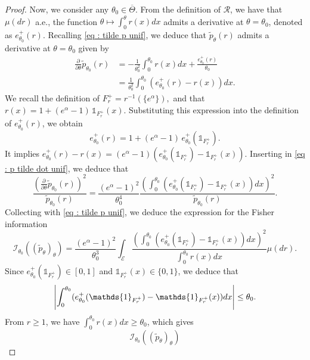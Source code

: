 \documentclass[a4paper, 11pt]{article}
\theoremstyle{definition}
\newcommand{\cE}{{\mathcal{E}}}
\newcommand{\cI}{{\mathcal{I}}}
\newcommand{\cR}{{\mathcal{R}}}
\newcommand{\indi}[1]{\mathds{1}_{#1}}
\DeclarePairedDelimiter{\abs}{\lvert}{\rvert}
\begin{document}
{\begin{proof}
Now, we consider any $\theta_0 \in \overline{\Theta}$. From the definition of $\cR$, we have that $\mu(dr)$ a.e., the function $\theta \mapsto \int_0^\theta r(x)dx$ admits a derivative at $\theta=\theta_0$, denoted as $e^+_{\theta_0}(r)$. Recalling \eqref{eq : tilde p unif}, we deduce that $\tilde{p}_\theta(r)$ admits a derivative at $\theta=\theta_0$ given by
\begin{align} \nonumber
	\frac{\partial}{\partial \theta} \tilde{p}_{\theta_0}(r)
	&= -\frac{1}{\theta_0^2}\int_0^{\theta_0} r(x)dx+\frac{e^+_{\theta_0}(r)}{\theta_0} 
	\\ \label{eq : p tilde dot unif}
	&= \frac{1}{\theta_0^2}\int_0^{\theta_0} (e^+_{\theta_0}(r)-r(x))dx.
\end{align}
We recall the definition of $F^+_r = r^{-1} \left( \{ e^\alpha \} \right),$
and that \( r(x) = 1 + (e^{\alpha} - 1) \, \indi{F^+_r}(x) \).  
Substituting this expression into the definition of \( e^+_{\theta_0}(r) \), we obtain  
\[
e^+_{\theta_0}(r) = 1 + (e^{\alpha} - 1) \, e^+_{\theta_0} \left( \indi{F^+_r} \right).
\]
It implies
$e^+_{\theta_0}(r)-r(x)=(e^{\alpha}-1)(e^+_{\theta_0}(\indi{F^+_r})-\indi{F^+_r}(x))$.
Inserting in \eqref{eq : p tilde dot unif}, we deduce that
\begin{equation*}
	\frac{(\frac{\partial}{\partial \theta} \tilde{p}_{\theta_0}(r))^2}{\tilde{p}_{\theta_0}(r)}
	=  \frac{(e^\alpha-1)^2}{\theta_0^4}\frac{\left( \int_0^{\theta_0} 
	(e^+_{\theta_0}(\indi{F^+_r})-\indi{F^+_r}(x))dx    \right)^2}{\widetilde{p}_{\theta_0}(r)}.
\end{equation*}
Collecting with  \eqref{eq : tilde p unif}, we deduce the expression for the Fisher information
\begin{equation*}
	\cI_{\theta_0}\left((\widetilde{p}_\theta)_\theta\right) 
	=	\frac{(e^\alpha-1)^2}{\theta_0^3}
	\int_{\cE}
\frac{\left( \int_0^{\theta_0} 
		(e^+_{\theta_0}(\indi{F^+_r})-\indi{F^+_r}(x))dx    \right)^2}{ \int_0^{\theta_0} r(x)dx } \mu(dr).
\end{equation*}	
	Since $e^+_{\theta_0}(\indi{F^+_r}) \in [0,1]$ and $\indi{F^+_r}(x)\in \{0,1\}$, we deduce that 
	\begin{equation} \label{eq : F_max unif}
	\abs*{ \int_0^{\theta_0} 
	(e^+_{\theta_0}(\indi{F^+_r})-\indi{F^+_r}(x))dx} \le \theta_0. 
	\end{equation}
	From $r\ge1$, we have $\int_0^{\theta_0} r(x)dx \ge \theta_0$, which gives
\begin{equation*}
	\cI_{\theta_0}\left((\widetilde{p}_\theta)_\theta\right) 

\end{equation*}
\end{proof}}
\end{document}
